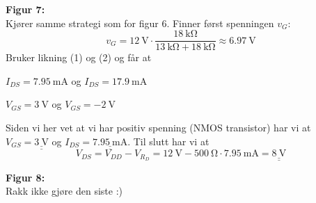 \documentclass[a4paper,11pt,norsk]{article}
\begin{document}
\begin{enumerate}
        \textbf{Figur 7:} \\
        Kjører samme strategi som for figur 6. Finner først spenningen $v_{G}$:
        \[
            v_{G} = \SI{12}{\volt} \cdot \frac{\SI{18}{\kilo\ohm}}{\SI{13}{\kilo\ohm} + \SI{18}{\kilo\ohm}} \approx \SI{6.97}{\volt}
        \]
        Bruker likning (1) og (2) og får at 
        \begin{center}
            $I_{DS} = \SI{7.95}{\milli\ampere}$ og $I_{DS} = \SI{17.9}{\milli\ampere}$ 
        \end{center}
        \begin{center}
            $V_{GS} = \SI{3}{\volt}$ og $V_{GS} = \SI{-2}{\volt}$ 
        \end{center}
        Siden vi her vet at vi har positiv spenning (NMOS transistor) har vi at 
            $V_{GS} = \underline{\underline{\SI{3}{\volt}}}$
        og 
            $I_{DS} = \underline{\underline{\SI{7.95}{\milli\ampere}}}$.
        Til slutt har vi at 
        \[
            V_{DS} = V_{DD} - V_{R_D} = \SI{12}{\volt} - \SI{500}{\ohm} \cdot \SI{7.95}{\milli\ampere} = \underline{\underline{\SI{8}{\volt}}}
        \]

        \textbf{Figur 8:} \\
        Rakk ikke gjøre den siste :)
\end{enumerate}
\end{document}
